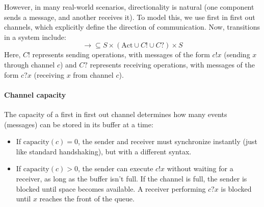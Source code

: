 However, in many real-world scenarios, directionality is natural (one component sends a message, and another receives it). 
To model this, we use first in first out channels, which explicitly define the direction of communication.
Now, transitions in a system include:
\[\rightarrow\subseteq S \times (\text{Act}\cup C! \cup C?) \times S\]
Here, $C!$ represents sending operations, with messages of the form $c!x$ (sending $x$ through channel $c$) and $C?$ represents receiving operations, with messages of the form $c?x$ (receiving $x$ from channel $c$).

\paragraph*{Channel capacity}
The capacity of a first in first out channel determines how many events (messages) can be stored in its buffer at a time: 
\begin{itemize}
    \item If $\text{capacity}(c) = 0$, the sender and receiver must synchronize instantly (just like standard handshaking), but with a different syntax.
    \item If $\text{capacity}(c) > 0$, the sender can execute $c!x$ without waiting for a receiver, as long as the buffer isn't full.
        If the channel is full, the sender is blocked until space becomes available.
        A receiver performing $c?x$ is blocked until $x$ reaches the front of the queue.
\end{itemize}
